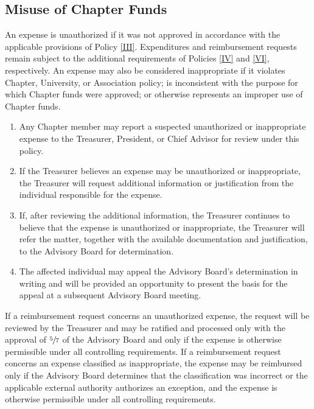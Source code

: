 \subsection{Misuse of Chapter Funds} \label{III.7}
An expense is unauthorized if it was not approved in accordance with the applicable provisions of Policy \ref{III}. 
Expenditures and reimbursement requests remain subject to the additional requirements of Policies \ref{IV} and \ref{VI}, respectively. 
An expense may also be considered inappropriate if it violates Chapter, University, or Association policy; is inconsistent 
with the purpose for which Chapter funds were approved; or otherwise represents an improper use of Chapter funds.
\begin{enumerate}
    \item Any Chapter member may report a suspected unauthorized or inappropriate expense to the Treasurer, President, or Chief Advisor for review under this policy.
    \item If the Treasurer believes an expense may be unauthorized or inappropriate, the Treasurer will request additional information or justification from the individual responsible for the expense.
    \item If, after reviewing the additional information, the Treasurer continues to believe that the expense is unauthorized or inappropriate, 
    the Treasurer will refer the matter, together with the available documentation and justification, to the Advisory Board for determination.
    \item The affected individual may appeal the Advisory Board’s determination in writing and will be provided an opportunity to present the basis for the appeal at a subsequent Advisory Board meeting.
\end{enumerate}
If a reimbursement request concerns an unauthorized expense, the request will be reviewed by the Treasurer and may be ratified and processed only with the approval of $\sfrac{5}{7}$ of 
the Advisory Board and only if the expense is otherwise permissible under all controlling requirements. 
If a reimbursement request concerns an expense classified as inappropriate, the expense may be reimbursed only if the Advisory Board determines that the classification was incorrect 
or the applicable external authority authorizes an exception, and the expense is otherwise permissible under all controlling requirements.